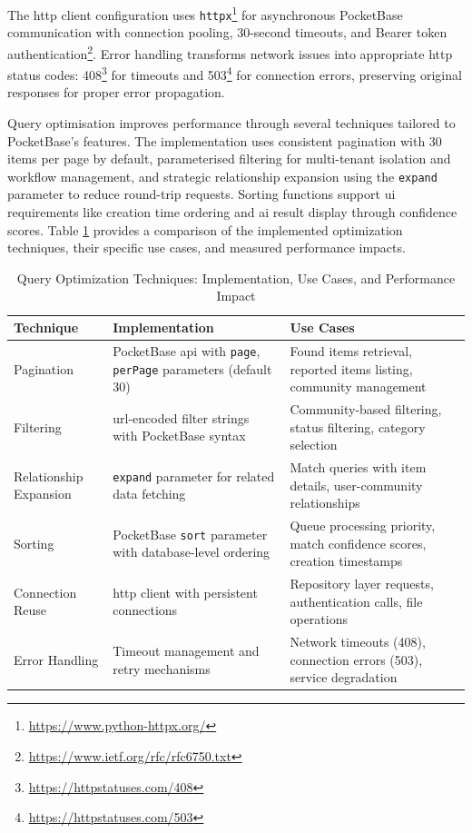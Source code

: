 The \ac{http} client configuration uses \texttt{httpx}\footnote{\url{https://www.python-httpx.org/}} for asynchronous PocketBase communication with connection pooling, 30-second timeouts, and Bearer token authentication\footnote{\url{https://www.ietf.org/rfc/rfc6750.txt}}. Error handling transforms network issues into appropriate \ac{http} status codes: 408\footnote{\url{https://httpstatuses.com/408}} for timeouts and 503\footnote{\url{https://httpstatuses.com/503}} for connection errors, preserving original responses for proper error propagation.

Query optimisation improves performance through several techniques tailored to PocketBase's features. The implementation uses consistent pagination with 30 items per page by default, parameterised filtering for multi-tenant isolation and workflow management, and strategic relationship expansion using the \texttt{expand} parameter to reduce round-trip requests. Sorting functions support \ac{ui} requirements like creation time ordering and \ac{ai} result display through confidence scores. Table \ref{tab:query_optimization} provides a comparison of the implemented optimization techniques, their specific use cases, and measured performance impacts.

\begin{table}[htbp]
    \centering
    \caption[Query Optimization Techniques]{Query Optimization Techniques: Implementation, Use Cases, and Performance Impact}
    \label{tab:query_optimization}
    \footnotesize
    \begin{tabular}{p{2.2cm}p{4.5cm}p{6cm}}
        \hline
        \textbf{Technique} & \textbf{Implementation} & \textbf{Use Cases} \\
        \hline
        Pagination & PocketBase \ac{api} with \texttt{page}, \texttt{perPage} parameters (default 30) & Found items retrieval, reported items listing, community management \\
        \hline
        Filtering & \ac{url}-encoded filter strings with PocketBase syntax & Community-based filtering, status filtering, category selection \\
        \hline
        Relationship Expansion & \texttt{expand} parameter for related data fetching & Match queries with item details, user-community relationships \\
        \hline
        Sorting & PocketBase \texttt{sort} parameter with database-level ordering & Queue processing priority, match confidence scores, creation timestamps \\
        \hline
        Connection Reuse & \ac{http} client with persistent connections & Repository layer requests, authentication calls, file operations \\
        \hline
        Error Handling & Timeout management and retry mechanisms & Network timeouts (408), connection errors (503), service degradation \\
        \hline
    \end{tabular}
\end{table}

